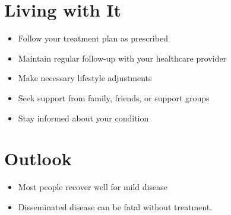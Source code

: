 \section{Living with It}
\begin{itemize}[noitemsep]
  \item Follow your treatment plan as prescribed
  \item Maintain regular follow-up with your healthcare provider
  \item Make necessary lifestyle adjustments
  \item Seek support from family, friends, or support groups
  \item Stay informed about your condition
\end{itemize}
\section{Outlook}
\begin{itemize}[noitemsep]
  \item Most people recover well for mild disease
  \item Disseminated disease can be fatal without treatment.
\end{itemize}
